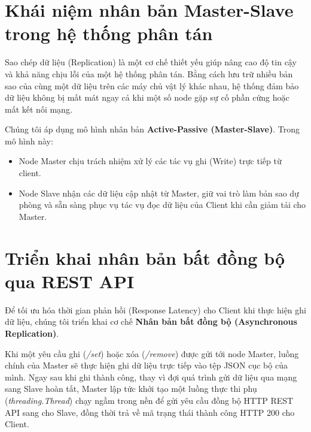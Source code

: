 \documentclass[12pt,a4paper]{report}
\begin{document}
\section{Khái niệm nhân bản Master-Slave trong hệ thống phân tán}
Sao chép dữ liệu (Replication) là một cơ chế thiết yếu giúp nâng cao độ tin cậy và khả năng chịu lỗi của một hệ thống phân tán. Bằng cách lưu trữ nhiều bản sao của cùng một dữ liệu trên các máy chủ vật lý khác nhau, hệ thống đảm bảo dữ liệu không bị mất mát ngay cả khi một số node gặp sự cố phần cứng hoặc mất kết nối mạng. 

Chúng tôi áp dụng mô hình nhân bản \textbf{Active-Passive (Master-Slave)}. Trong mô hình này:
\begin{itemize}
    \item Node Master chịu trách nhiệm xử lý các tác vụ ghi (Write) trực tiếp từ client.
    \item Node Slave nhận các dữ liệu cập nhật từ Master, giữ vai trò làm bản sao dự phòng và sẵn sàng phục vụ tác vụ đọc dữ liệu của Client khi cần giảm tải cho Master.
\end{itemize}

\section{Triển khai nhân bản bất đồng bộ qua REST API}
Để tối ưu hóa thời gian phản hồi (Response Latency) cho Client khi thực hiện ghi dữ liệu, chúng tôi triển khai cơ chế \textbf{Nhân bản bất đồng bộ (Asynchronous Replication)}. 

Khi một yêu cầu ghi (\textit{/set}) hoặc xóa (\textit{/remove}) được gửi tới node Master, luồng chính của Master sẽ thực hiện ghi dữ liệu trực tiếp vào tệp JSON cục bộ của mình. Ngay sau khi ghi thành công, thay vì đợi quá trình gửi dữ liệu qua mạng sang Slave hoàn tất, Master lập tức khởi tạo một luồng thực thi phụ (\textit{threading.Thread}) chạy ngầm trong nền để gửi yêu cầu đồng bộ HTTP REST API sang cho Slave, đồng thời trả về mã trạng thái thành công HTTP 200 cho Client.

        
        
\end{document}
